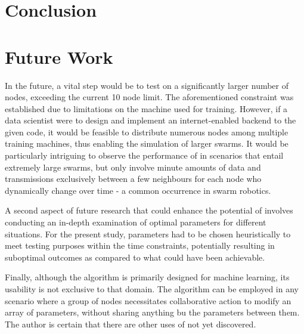 \section{Conclusion}




\section{Future Work}
In the future, a vital step would be to test \SL on a significantly larger number of nodes, exceeding the current 10 node limit. The aforementioned constraint was established due to limitations on the machine used for training. However, if a data scientist were to design and implement an internet-enabled backend to the given code, it would be feasible to distribute numerous nodes among multiple training machines, thus enabling the simulation of larger swarms. It would be particularly intriguing to observe the performance of \SL in scenarios that entail extremely large swarms, but only involve minute amounts of data and transmissions exclusively between a few neighbours for each node who dynamically change over time - a common occurrence in swarm robotics.

A second aspect of future research that could enhance the potential of \SL involves conducting an in-depth examination of optimal parameters for different situations. For the present study, parameters had to be chosen heuristically to meet testing purposes within the time constraints, potentially resulting in suboptimal outcomes as compared to what could have been achievable.

Finally, although the \SL algorithm is primarily designed for machine learning, its usability is not exclusive to that domain. The algorithm can be employed in any scenario where a group of nodes necessitates collaborative action to modify an array of parameters, without sharing anything bu the parameters between them. The author is certain that there are other uses of \SL not yet discovered.